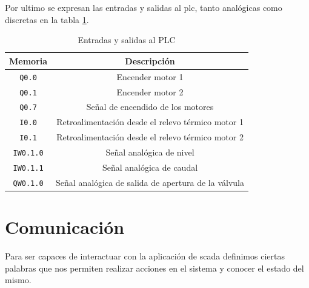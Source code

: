 Por ultimo se expresan las entradas y salidas al \gls{plc}, tanto analógicas
como discretas en la tabla \ref{table:entradassalidas}.

\begin{table}[!t]

\renewcommand{\arraystretch}{1.3}
\centering
\begin{tabular}{c||c}
\hline
\bfseries Memoria & \bfseries Descripción\\
\hline \hline
\verb|Q0.0|  & Encender motor 1\\
\verb|Q0.1|  & Encender motor 2\\
\verb|Q0.7|  & Señal de encendido de los motores\\
\verb|I0.0|  & Retroalimentación desde el relevo térmico motor 1\\
\verb|I0.1|  & Retroalimentación desde el relevo térmico motor 2\\
\verb|IW0.1.0|  & Señal analógica de nivel\\
\verb|IW0.1.1|  & Señal analógica de caudal \\
\verb|QW0.1.0|  & Señal analógica de salida de apertura de la válvula \\
\hline
\end{tabular}
\caption{Entradas y salidas al PLC}
\label{table:entradassalidas}
\end{table}

\section{Comunicación}
\label{sec:Comunicacion}

Para ser capaces de interactuar con la aplicación de \gls{scada} definimos
ciertas palabras que nos permiten realizar acciones en el sistema y conocer
el estado del mismo.

